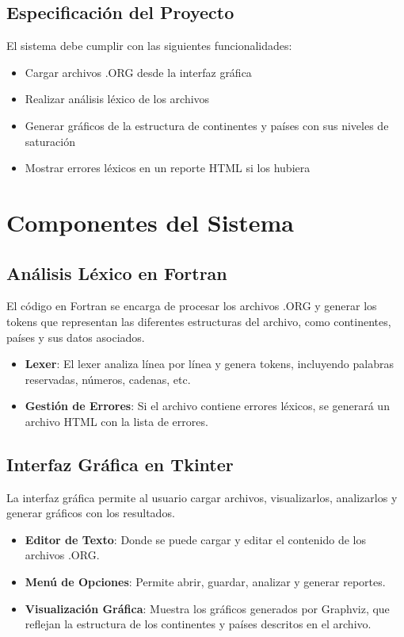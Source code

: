 \documentclass[12pt, letterpaper, twosite]{article}
\begin{document}
\subsection{Especificación del Proyecto}
El sistema debe cumplir con las siguientes funcionalidades:
\begin{itemize}
    \item Cargar archivos .ORG desde la interfaz gráfica
    \item Realizar análisis léxico de los archivos
    \item Generar gráficos de la estructura de continentes y países con sus niveles de saturación
    \item Mostrar errores léxicos en un reporte HTML si los hubiera
\end{itemize}

\section{Componentes del Sistema}
\subsection{Análisis Léxico en Fortran}
El código en Fortran se encarga de procesar los archivos .ORG y generar los tokens que representan las diferentes estructuras del archivo, como continentes, países y sus datos asociados.

\begin{itemize}
    \item \textbf{Lexer}: El lexer analiza línea por línea y genera tokens, incluyendo palabras reservadas, números, cadenas, etc.
    \item \textbf{Gestión de Errores}: Si el archivo contiene errores léxicos, se generará un archivo HTML con la lista de errores.
\end{itemize}

\subsection{Interfaz Gráfica en Tkinter}
La interfaz gráfica permite al usuario cargar archivos, visualizarlos, analizarlos y generar gráficos con los resultados. 
\begin{itemize}
    \item \textbf{Editor de Texto}: Donde se puede cargar y editar el contenido de los archivos .ORG.
    \item \textbf{Menú de Opciones}: Permite abrir, guardar, analizar y generar reportes.
    \item \textbf{Visualización Gráfica}: Muestra los gráficos generados por Graphviz, que reflejan la estructura de los continentes y países descritos en el archivo.
\end{itemize}
\end{document}
